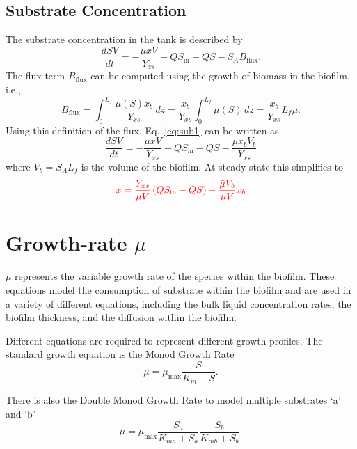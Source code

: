 \documentclass[letterpaper, twoside]{article}
\numberwithin{equation}{section}
\newcommand{\ie}{i.e.}
\begin{document}
\subsection{Substrate Concentration}
The substrate concentration in the tank is described by
\begin{equation}\label{eq:sub1}
  \frac{dS V}{dt} = -\frac{\mu x V}{Y_{xs}} + Q S_{\mathrm{in}} - Q S - S_A B_{\mathrm{flux}}.
\end{equation}
The flux term $B_\mathrm{flux}$ can be computed using the growth of biomass in the biofilm, \ie,
\begin{equation}
  B_\mathrm{flux} = \int_0^{L_f} \frac{\mu(S) x_b}{Y_{xs}} \, dz = \frac{ x_b}{Y_{xs}}\int_0^{L_f} \mu(S) \, dz = \frac{ x_b}{Y_{xs}} L_f \bar{\mu}.
\end{equation}
 Using this definition of the flux, Eq.~\ref{eq:sub1} can be written as
\begin{equation}
  \frac{dS V}{dt} = -\frac{\mu x V}{Y_{xs}} + Q S_{\mathrm{in}} - Q S -\frac{\bar{\mu} x_b V_b}{Y_{xs}}
\end{equation}
where $V_b=S_A L_f$ is the volume of the biofilm.   At steady-state this simplifies to 
\begin{equation}
 {\color{red}
   x = \frac{Y_{xs}}{\mu V}\left(Q S_{\mathrm{in}} - Q S\right) -\frac{\bar{\mu} V_b}{\mu V}x_b
 }
\end{equation}




\section{Growth-rate $\mu$}\label{sec:mu}
$\mu$ represents the variable growth rate of the species within the biofilm. These equations model the consumption of substrate within the biofilm and are used in a variety of different equations, including the bulk liquid concentration rates, the biofilm thickness, and the diffusion within the biofilm.

Different equations are required to represent different growth profiles. The standard growth equation is the Monod Growth Rate
\begin{equation} \label{eq: MonodGrowthRate}
  \mu=\mu_\mathrm{max} \frac{S}{K_m + S}.
\end{equation}

There is also the Double Monod Growth Rate to model multiple substrates `a' and `b'
\begin{equation} \label{eq: DoubleMonodGrowthRate}
  \mu=\mu_\mathrm{max} \frac{S_a}{K_{ma} + S_a} \frac{S_b}{K_{mb} + S_b}.
\end{equation}
\end{document}
